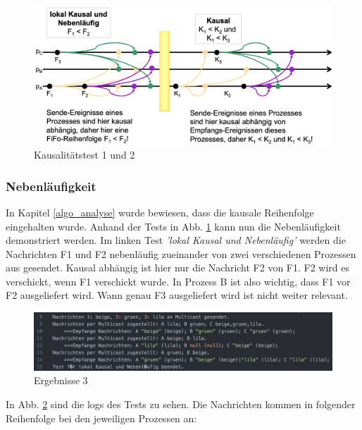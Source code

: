 \begin{figure}[htbp]
\begin{center}
\includegraphics[scale=0.2]{Latex/Bilder/Test1_2.png}
\caption{\label{test1_2} Kausalitätstest 1 und 2 \cite{Aufgabenstellung}}
\end{center}
\end{figure}

\subsubsection{Nebenläufigkeit}

In Kapitel \ref{algo_analyse} wurde bewiesen, dass die kausale Reihenfolge eingehalten wurde. Anhand der Tests in Abb. \ref{test1_2} kann nun die Nebenläufigkeit demonstriert werden. Im linken Test \textit{'lokal Kausal und Nebenläufig'} werden die Nachrichten F1 und F2 nebenläufig zueinander von zwei verschiedenen Prozessen aus gesendet. Kausal abhängig ist hier nur die Nachricht F2 von F1. F2 wird es verschickt, wenn F1 verschickt wurde. In Prozess B ist also wichtig, dass F1 vor F2 ausgeliefert wird. Wann genau F3 ausgeliefert wird ist nicht weiter relevant.

\begin{figure}[htbp]
\begin{center}
\includegraphics[scale=0.5]{Latex/Bilder/test1_1_results.png}
\caption{\label{test1_2_result} Ergebnisse 3}
\end{center}
\end{figure}

In Abb. \ref{test1_2_result} sind die logs des Tests zu sehen. Die Nachrichten kommen in folgender Reihenfolge bei den jeweiligen Prozessen an:

